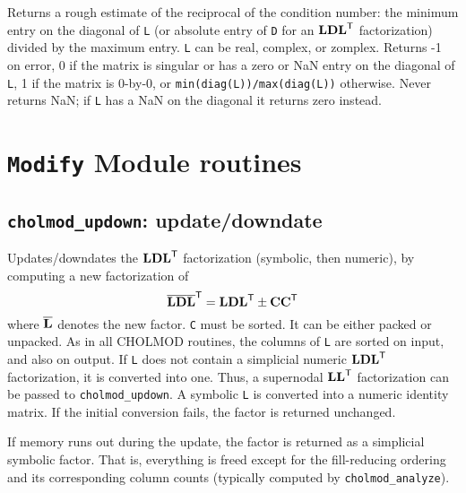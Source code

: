 \documentclass[11pt]{article}
\newcommand{\m}[1]{{\bf{#1}}}       %
\newcommand{\tr}{^{\sf T}}          %
\newcommand{\new}[1]{\overline{#1}}
\begin{document}

Returns a rough estimate of the reciprocal of the condition number: the minimum
entry on the diagonal of {\tt L} (or absolute entry of {\tt D} for an
$\m{LDL}\tr$ factorization) divided by the maximum entry.  {\tt L} can be real,
complex, or zomplex.  Returns -1 on error, 0 if the matrix is singular or has a
zero or NaN entry on the diagonal of {\tt L}, 1 if the matrix is 0-by-0, or
{\tt min(diag(L))/max(diag(L))} otherwise.  Never returns NaN; if {\tt L} has a
NaN on the diagonal it returns zero instead.

\newpage \section{{\tt Modify} Module routines}

\subsection{{\tt cholmod\_updown}: update/downdate}


Updates/downdates the $\m{LDL}\tr$ factorization (symbolic, then numeric), by
computing a new factorization of
\[
\new{\m{L}}\new{\m{D}}\new{\m{L}}\tr = \m{LDL}\tr \pm \m{CC}\tr
\]
where $\new{\m{L}}$ denotes the new factor.  {\tt C} must be sorted.  It can be
either packed or unpacked.  As in all CHOLMOD routines, the columns of {\tt L}
are sorted on input, and also on output.  If {\tt L} does not contain a
simplicial numeric $\m{LDL}\tr$ factorization, it is converted into one.  Thus,
a supernodal $\m{LL}\tr$ factorization can be passed to {\tt cholmod\_updown}.
A symbolic {\tt L} is converted into a numeric identity matrix.  If the initial
conversion fails, the factor is returned unchanged.

If memory runs out during the update, the factor is returned as a simplicial
symbolic factor.  That is, everything is freed except for the fill-reducing
ordering and its corresponding column counts (typically computed by
{\tt cholmod\_analyze}).
\end{document}
